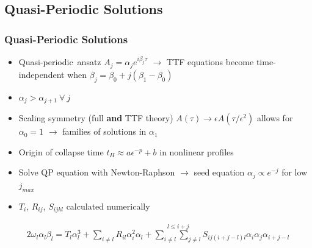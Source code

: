 \documentclass[mathserif,10pt]{beamer}
\newcommand{\bi}{\begin{itemize}}
\newcommand{\ei}{\end{itemize}}
\newcommand{\its}{\item}
\newcommand{\scr}{\scriptsize}
\newcommand{\jm}{j_{max}}
\begin{document}
\subsection{Quasi-Periodic Solutions}
\frame
{
  \frametitle{Quasi-Periodic Solutions}
  \bi
  \its Quasi-periodic\footnotemark\ ansatz $A_j = \alpha_j e^{i \beta_j \tau}$ $\to$ TTF equations become time-independent when $\beta_j = \beta_0 + j(\beta_1 - \beta_0)$
  \its $\alpha_j > \alpha_{j+1} \: \forall \: j $
  \its Scaling symmetry (full {\bf and} TTF theory) $A(\tau) \to \epsilon A(\tau / \epsilon^2)$ allows for $\alpha_0 = 1$ $\to$ families of solutions in $\alpha_1$ 
  \its Origin of collapse time $t_H \approx a \epsilon^{-p} + b$ in nonlinear profiles
  \its Solve QP equation with Newton-Raphson $\to$ seed equation $\alpha_j \propto e^{-j}$ for low $\jm$
  \its $T_i$, $R_{ij}$, $S_{ijkl}$ calculated numerically
  \ei
  
   \begin{align*}
  2\omega_l \alpha_l \beta_l = T_l \alpha_l^3 + \sum_{i \neq l} R_{il} \alpha_i^2 \alpha_l + \stackrel{l \leq i + j}{\sum_{i \neq l} \sum_{j \neq l}} S_{i j (i+j-l)l} \alpha_i \alpha_j \alpha_{i+j-l}
  \end{align*}
  
  \footnotetext[9]{{\scr Green {\it et al.} [1507.08261]}}
}
\end{document}
